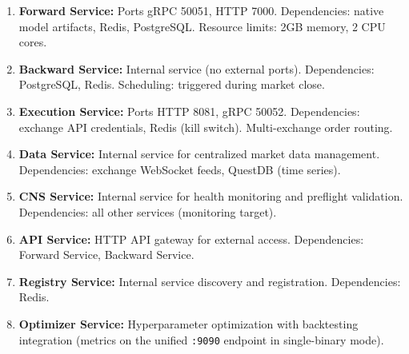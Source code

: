 \documentclass[12pt, a4paper]{article}
\begin{document}
\begin{enumerate}
	\item \textbf{Forward Service:}
	      Ports gRPC 50051, HTTP 7000. Dependencies: native model artifacts, Redis, PostgreSQL. Resource limits: 2GB memory, 2 CPU cores.

	\item \textbf{Backward Service:}
	      Internal service (no external ports). Dependencies: PostgreSQL, Redis. Scheduling: triggered during market close.

	\item \textbf{Execution Service:}
	      Ports HTTP 8081, gRPC 50052. Dependencies: exchange API credentials, Redis (kill switch). Multi-exchange order routing.

	\item \textbf{Data Service:}
	      Internal service for centralized market data management. Dependencies: exchange WebSocket feeds, QuestDB (time series).

	\item \textbf{CNS Service:}
	      Internal service for health monitoring and preflight validation. Dependencies: all other services (monitoring target).

	\item \textbf{API Service:}
	      HTTP API gateway for external access. Dependencies: Forward Service, Backward Service.

	\item \textbf{Registry Service:}
	      Internal service discovery and registration. Dependencies: Redis.

	\item \textbf{Optimizer Service:}
	      Hyperparameter optimization with backtesting integration (metrics on the unified \texttt{:9090} endpoint in single-binary mode).
\end{enumerate}
\end{document}
